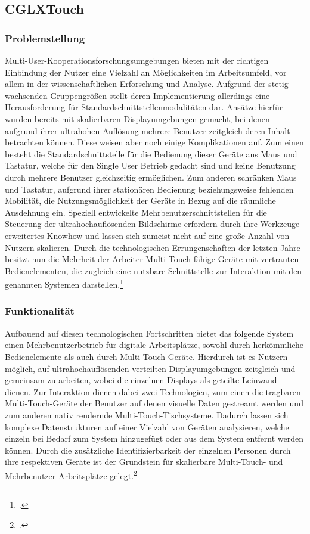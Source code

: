 \subsection{CGLXTouch}
\subsubsection{Problemstellung}
Multi-User-Kooperationsforschungsumgebungen bieten mit der richtigen Einbindung der Nutzer eine Vielzahl an Möglichkeiten im Arbeitsumfeld, vor allem in der wissenschaftlichen Erforschung und Analyse. Aufgrund der stetig wachsenden Gruppengrößen stellt deren Implementierung allerdings eine Herausforderung für Standardschnittstellenmodalitäten dar. Ansätze hierfür wurden bereits mit skalierbaren Displayumgebungen gemacht, bei denen aufgrund ihrer ultrahohen Auflösung mehrere Benutzer zeitgleich deren Inhalt betrachten können. Diese weisen aber noch einige Komplikationen auf. Zum einen besteht die Standardschnittstelle für die Bedienung dieser Geräte aus Maus und Tastatur, welche für den Single User Betrieb gedacht sind und keine Benutzung durch mehrere Benutzer gleichzeitig ermöglichen. Zum anderen schränken Maus und Tastatur, aufgrund ihrer stationären Bedienung beziehungsweise fehlenden Mobilität, die Nutzungsmöglichkeit der Geräte in Bezug auf die räumliche Ausdehnung ein. Speziell entwickelte Mehrbenutzerschnittstellen für die Steuerung der ultrahochauflösenden Bildschirme erfordern durch ihre Werkzeuge erweitertes Knowhow und lassen sich zumeist nicht auf eine große Anzahl von Nutzern skalieren. Durch die technologischen Errungenschaften der letzten Jahre besitzt nun die Mehrheit der Arbeiter Multi-Touch-fähige Geräte mit vertrauten Bedienelementen, die zugleich eine nutzbare Schnittstelle zur Interaktion mit den genannten Systemen darstellen.\footcite[Vgl.][Seite 649]{Table}

\subsubsection{Funktionalität}
Aufbauend auf diesen technologischen Fortschritten bietet das folgende System einen Mehrbenutzerbetrieb für digitale Arbeitsplätze, sowohl durch herkömmliche Bedienelemente als auch durch Multi-Touch-Geräte. Hierdurch ist es Nutzern möglich, auf ultrahochauflösenden verteilten Displayumgebungen zeitgleich und gemeinsam zu arbeiten, wobei die einzelnen Displays als geteilte Leinwand dienen. Zur Interaktion dienen dabei zwei Technologien, zum einen die tragbaren Multi-Touch-Geräte der Benutzer auf denen visuelle Daten gestreamt werden und zum anderen nativ rendernde Multi-Touch-Tischsysteme. Dadurch lassen sich komplexe Datenstrukturen auf einer Vielzahl von Geräten analysieren, welche einzeln bei Bedarf zum System hinzugefügt oder aus dem System entfernt werden können. Durch die zusätzliche Identifizierbarkeit der einzelnen Personen durch ihre respektiven Geräte ist der Grundstein für skalierbare Multi-Touch- und Mehrbenutzer-Arbeitsplätze gelegt.\footcite[Vgl.][Seite 649]{Table}

